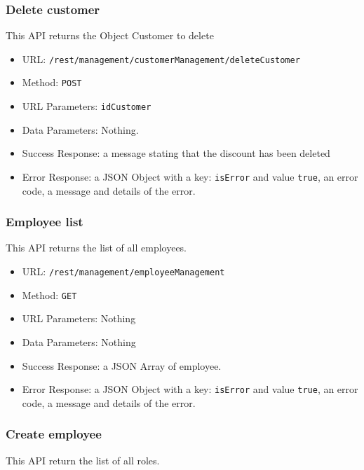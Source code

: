\subsubsection*{Delete customer}
This API returns the Object Customer to delete
\begin{itemize}
    \item URL: \texttt{/rest/management/customerManagement/deleteCustomer}
    \item Method: \texttt{POST}
    \item URL Parameters: \texttt{idCustomer}
    \item Data Parameters: Nothing.
    \item Success Response: a message stating that the discount has been deleted
    \item Error Response: a JSON Object with a key: \texttt{isError}  and value \texttt{true}, an error code, a message and details of the error.
\end{itemize}

\subsubsection*{Employee list}
This API returns the list of all employees. 

\begin{itemize}
    \item URL: \texttt{/rest/management/employeeManagement}
    \item Method: \texttt{GET}
    \item URL Parameters: Nothing
    \item Data Parameters: Nothing
    \item Success Response: a JSON Array of employee.
    \item Error Response: a JSON Object with a key: \texttt{isError}  and value \texttt{true}, an error code, a message and details of the error.
\end{itemize}

\subsubsection*{Create employee}
This API return the list of all roles.

